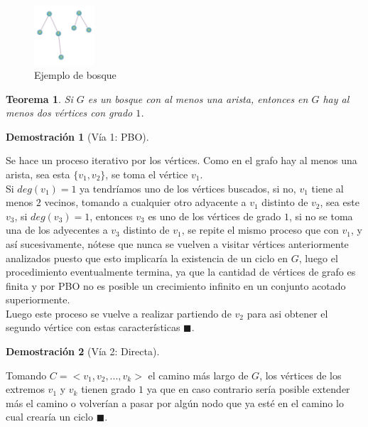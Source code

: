 \documentclass[a4paper,1pt]{report}
\newtheorem*{teo}{Teorema}
\newtheorem*{dem}{Demostración}
\begin{document}
\begin{figure}[H]
    \centering
    \includegraphics[width=0.2\textwidth]{figures2/bosque.png}
    \caption{Ejemplo de bosque}
\end{figure}


\begin{teo}
    Si $G$ es un bosque con al menos una arista, entonces en $G$ hay al menos dos v\'ertices con grado $1$.
\end{teo}

\begin{dem}[V\'ia 1: PBO]\end{dem}
    Se hace un proceso iterativo por los v\'ertices. Como en el grafo hay al menos una arista, sea esta $\{v_1, v_2\}$, se toma el v\'ertice $v_1$.\\
    
    Si $deg(v_1) = 1$ ya tendr\'iamos uno de los v\'ertices buscados, si no, $v_1$ tiene al menos $2$ vecinos, tomando a cualquier otro adyacente a $v_1$ distinto de $v_2$, sea este $v_3$, si $deg(v_3) = 1$, entonces $v_3$ es uno de los v\'ertices de grado $1$, si no se toma una de los adyecentes a $v_3$ distinto de $v_1$, se repite el mismo proceso que con $v_1$, y as\'i sucesivamente, n\'otese que nunca se vuelven a visitar v\'ertices anteriormente analizados puesto que esto implicar\'ia la existencia de un ciclo en $G$, luego el procedimiento eventualmente termina, ya que la cantidad de v\'ertices de grafo es finita y por PBO no es posible un crecimiento infinito en un conjunto acotado superiormente.\\
    
    Luego este proceso se vuelve a realizar partiendo de $v_2$ para asi obtener el segundo v\'ertice con estas caracter\'isticas $\blacksquare$.

\begin{dem}[V\'ia 2: Directa]\end{dem}

    Tomando $C = <v_1, v_2, ..., v_k>$ el camino m\'as largo de $G$, los v\'ertices de los extremos $v_1$ y  $v_k$ tienen grado $1$ ya que en caso contrario ser\'ia posible extender m\'as el camino o volver\'ian a pasar por alg\'un nodo que ya est\'e en el camino lo cual crear\'ia un ciclo $\blacksquare$.
\end{document}
